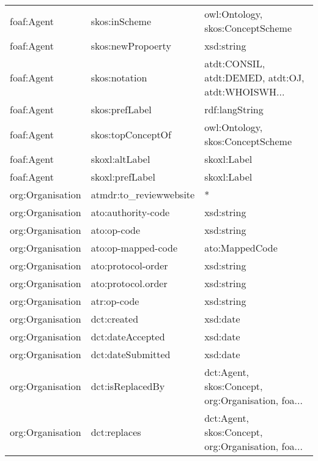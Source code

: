 \documentclass[10pt,a4paper,titlepage,final]{article}
\begin{document}
\begin{longtable}{lll}
          foaf:Agent &           skos:inScheme &                   owl:Ontology, skos:ConceptScheme \\
          foaf:Agent &       skos:newPropoerty &                                         xsd:string \\
          foaf:Agent &           skos:notation &  atdt:CONSIL, atdt:DEMED, atdt:OJ, atdt:WHOISWH... \\
          foaf:Agent &          skos:prefLabel &                                     rdf:langString \\
          foaf:Agent &       skos:topConceptOf &                   owl:Ontology, skos:ConceptScheme \\
          foaf:Agent &          skoxl:altLabel &                                        skoxl:Label \\
          foaf:Agent &         skoxl:prefLabel &                                        skoxl:Label \\
    org:Organisation &  atmdr:to\_reviewwebsite &                                                  * \\
    org:Organisation &      ato:authority-code &                                         xsd:string \\
    org:Organisation &             ato:op-code &                                         xsd:string \\
    org:Organisation &      ato:op-mapped-code &                                     ato:MappedCode \\
    org:Organisation &      ato:protocol-order &                                         xsd:string \\
    org:Organisation &      ato:protocol.order &                                         xsd:string \\
    org:Organisation &             atr:op-code &                                         xsd:string \\
    org:Organisation &             dct:created &                                           xsd:date \\
    org:Organisation &        dct:dateAccepted &                                           xsd:date \\
    org:Organisation &       dct:dateSubmitted &                                           xsd:date \\
    org:Organisation &        dct:isReplacedBy &  dct:Agent, skos:Concept, org:Organisation, foa... \\
    org:Organisation &            dct:replaces &  dct:Agent, skos:Concept, org:Organisation, foa... \\

\end{longtable}
\end{document}
